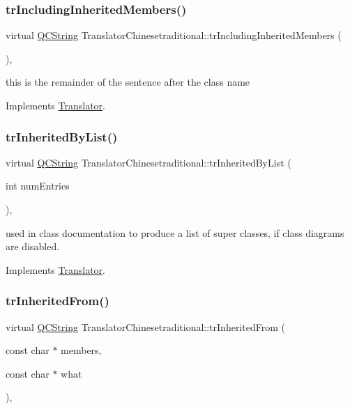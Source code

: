 \subsubsection{\texorpdfstring{trIncludingInheritedMembers()}{trIncludingInheritedMembers()}}
{\footnotesize\ttfamily virtual \mbox{\hyperlink{class_q_c_string}{Q\+C\+String}} Translator\+Chinesetraditional\+::tr\+Including\+Inherited\+Members (\begin{DoxyParamCaption}{ }\end{DoxyParamCaption})\hspace{0.3cm}{\ttfamily [inline]}, {\ttfamily [virtual]}}

this is the remainder of the sentence after the class name 

Implements \mbox{\hyperlink{class_translator}{Translator}}.

\mbox{\label{class_translator_chinesetraditional_a39a3b2bb06ce928b00ccd3425cb51015}} 
\subsubsection{\texorpdfstring{trInheritedByList()}{trInheritedByList()}}
{\footnotesize\ttfamily virtual \mbox{\hyperlink{class_q_c_string}{Q\+C\+String}} Translator\+Chinesetraditional\+::tr\+Inherited\+By\+List (\begin{DoxyParamCaption}\item[{int}]{num\+Entries }\end{DoxyParamCaption})\hspace{0.3cm}{\ttfamily [inline]}, {\ttfamily [virtual]}}

used in class documentation to produce a list of super classes, if class diagrams are disabled. 

Implements \mbox{\hyperlink{class_translator}{Translator}}.

\mbox{\label{class_translator_chinesetraditional_ac1bf1062680895db546f1695adec0d0c}} 
\subsubsection{\texorpdfstring{trInheritedFrom()}{trInheritedFrom()}}
{\footnotesize\ttfamily virtual \mbox{\hyperlink{class_q_c_string}{Q\+C\+String}} Translator\+Chinesetraditional\+::tr\+Inherited\+From (\begin{DoxyParamCaption}\item[{const char $\ast$}]{members,  }\item[{const char $\ast$}]{what }\end{DoxyParamCaption})\hspace{0.3cm}{\ttfamily [inline]}, {\ttfamily [virtual]}}

